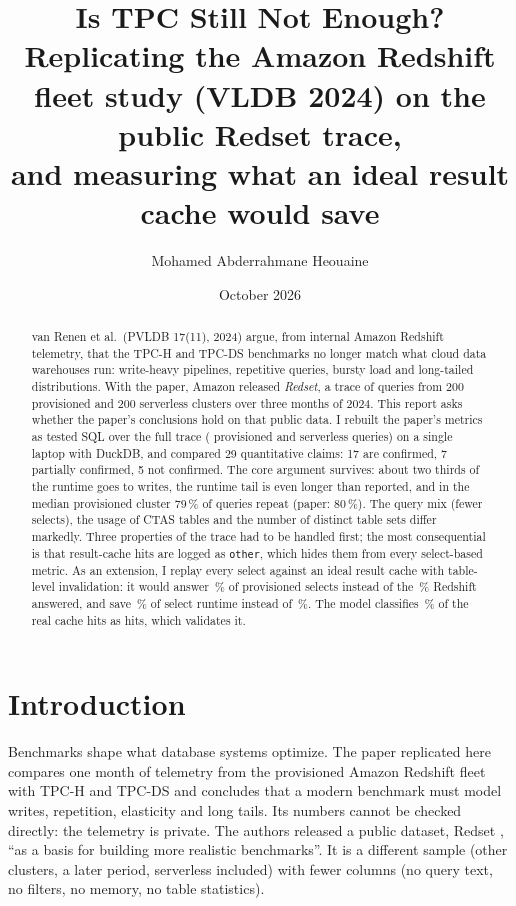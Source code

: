 \documentclass[10pt,a4paper]{article}
\title{\textbf{Is TPC Still Not Enough?}\\[0.3em]
\large Replicating the Amazon Redshift fleet study (VLDB 2024) on the public Redset trace,\\
and measuring what an ideal result cache would save}
\author{Mohamed Abderrahmane Heouaine}
\date{October 2026}
\begin{document}
\maketitle

\begin{abstract}
\noindent
van Renen et al.\ (PVLDB 17(11), 2024) argue, from internal Amazon Redshift telemetry, that the TPC-H and TPC-DS benchmarks no longer match what cloud data warehouses run: write-heavy pipelines, repetitive queries, bursty load and long-tailed distributions. With the paper, Amazon released \emph{Redset}, a trace of queries from 200 provisioned and 200 serverless clusters over three months of 2024. This report asks whether the paper's conclusions hold on that public data. I rebuilt the paper's metrics as tested SQL over the full trace (\QueriesProv{} provisioned and \QueriesServ{} serverless queries) on a single laptop with DuckDB, and compared 29 quantitative claims: 17 are confirmed, 7 partially confirmed, 5 not confirmed. The core argument survives: about two thirds of the runtime goes to writes, the runtime tail is even longer than reported, and in the median provisioned cluster 79\,\% of queries repeat (paper: 80\,\%). The query mix (fewer selects), the usage of CTAS tables and the number of distinct table sets differ markedly. Three properties of the trace had to be handled first; the most consequential is that result-cache hits are logged as \texttt{other}, which hides them from every select-based metric. As an extension, I replay every select against an ideal result cache with table-level invalidation: it would answer \IdealHitProv\,\% of provisioned selects instead of the \RealHitProv\,\% Redshift answered, and save \IdealSavedProv\,\% of select runtime instead of \RealSavedProv\,\%. The model classifies \ModelExplainsProv\,\% of the real cache hits as hits, which validates it.
\end{abstract}

\section{Introduction}

Benchmarks shape what database systems optimize. The paper replicated here \cite{tpc} compares one month of telemetry from the provisioned Amazon Redshift fleet with TPC-H and TPC-DS and concludes that a modern benchmark must model writes, repetition, elasticity and long tails. Its numbers cannot be checked directly: the telemetry is private. The authors released a public dataset, Redset \cite{redset}, ``as a basis for building more realistic benchmarks''. It is a different sample (other clusters, a later period, serverless included) with fewer columns (no query text, no filters, no memory, no table statistics).
\end{document}
